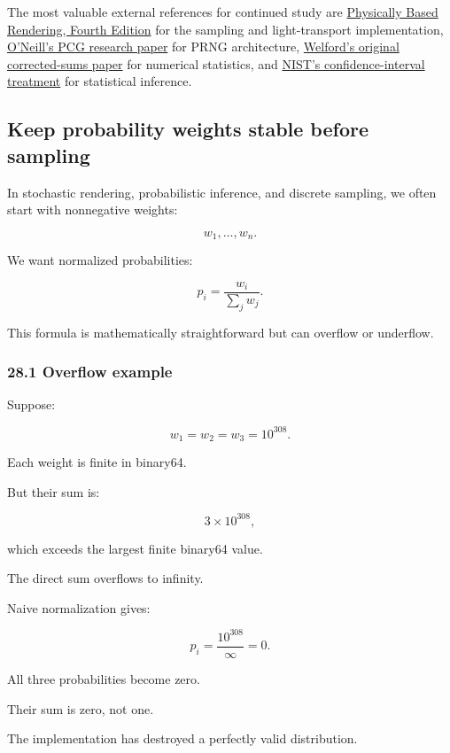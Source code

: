 The most valuable external references for continued study are \href{https://pbr-book.org/4ed/?utm_source=chatgpt.com}{Physically Based Rendering, Fourth Edition} for the sampling and light-transport implementation, \href{https://www.pcg-random.org/paper.html?utm_source=chatgpt.com}{O'Neill's PCG research paper} for PRNG architecture, \href{https://doi.org/10.1080/00401706.1962.10490022?utm_source=chatgpt.com}{Welford's original corrected-sums paper} for numerical statistics, and \href{https://www.itl.nist.gov/div898/handbook/eda/section3/eda352.htm?utm_source=chatgpt.com}{NIST's confidence-interval treatment} for statistical inference.

\subsection{Keep probability weights stable before sampling}\label{keep-probability-weights-stable-before-sampling}

In stochastic rendering, probabilistic inference, and discrete sampling, we often start with nonnegative weights:

\[ w_1,\ldots,w_n. \]

We want normalized probabilities:

\[ \boxed{ p_i=\frac{w_i}{\sum_jw_j} }. \]

This formula is mathematically straightforward but can overflow or underflow.

\subsubsection{28.1 Overflow example}\label{overflow-example}

Suppose:

\[ w_1=w_2=w_3=10^{308}. \]

Each weight is finite in binary64.

But their sum is:

\[ 3\times10^{308}, \]

which exceeds the largest finite binary64 value.

The direct sum overflows to infinity.

Naive normalization gives:

\[ p_i=\frac{10^{308}}{\infty}=0. \]

All three probabilities become zero.

Their sum is zero, not one.

The implementation has destroyed a perfectly valid distribution.

